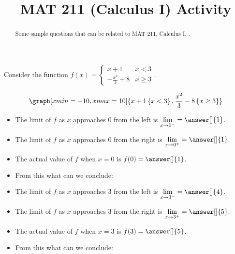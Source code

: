 \documentclass{ximera}
\title{MAT 211 (Calculus I) Activity}
\begin{document}
      
\begin{abstract}
      
Some sample questions that can be related to MAT 211, Calculus I.
.
      
\end{abstract}
      
\maketitle
      
      
\begin{question}      
Consider the function $f(x)=\begin{cases}x+1 & x<3 \\ -\frac{x^2}{3}+8 & x\geq 3\end{cases}$.

\begin{onlineOnly}
$$\graph[xmin=-10,xmax=10]{x+1\left\{x<3\right\}, \frac{x^2}{3}-8\left\{x\ge 3\right\}}$$
\end{onlineOnly}


\begin{itemize}
\item The limit of $f$ as $x$ approaches 0 from the left is $\displaystyle\lim_{x\to 0^-}=\answer[]{1}$.
\item The limit of $f$ as $x$ approaches 0 from the right is $\displaystyle\lim_{x\to 0^+}=\answer[]{1}$.
\item The actual value of $f$ when $x=0$ is $f(0)=\answer[]{1}$.
\item From this what can we conclude:
\begin{multipleChoice}
\end{multipleChoice}
\item The limit of $f$ as $x$ approaches 3 from the left is $\displaystyle\lim_{x\to 3^-}=\answer[]{4}$.
\item The limit of $f$ as $x$ approaches 3 from the right is $\displaystyle\lim_{x\to 3^+}=\answer[]{5}$.
\item The actual value of $f$ when $x=3$ is $f(3)=\answer[]{5}$.
\item From this what can we conclude:
\begin{multipleChoice}
\end{multipleChoice}

\end{itemize}


\end{question}
\end{document}
